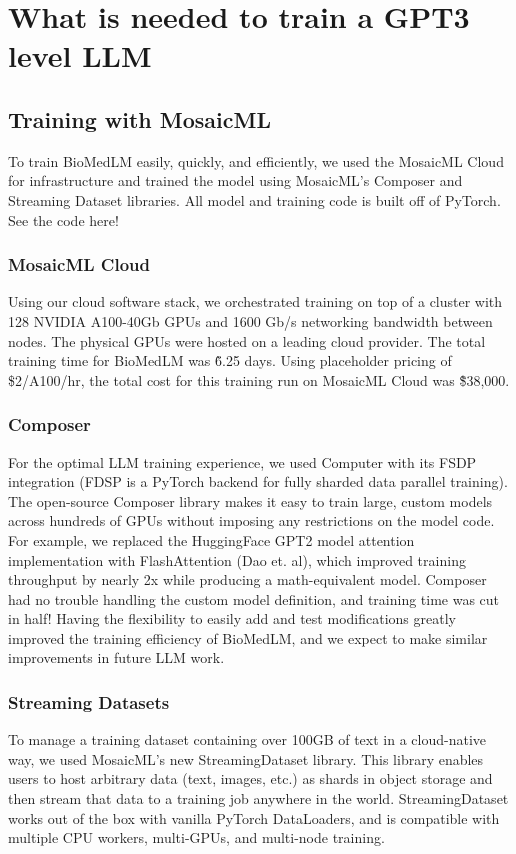 \documentclass[letterpaper]{article}
\begin{document}
\section{What is needed to train a GPT3 level LLM}
\subsection{Training with MosaicML}

To train BioMedLM easily, quickly, and efficiently, we used the MosaicML Cloud for infrastructure and trained the model using MosaicML’s Composer and Streaming Dataset libraries. All model and training code is built off of PyTorch. See the code here!

\subsubsection{MosaicML Cloud}
Using our cloud software stack, we orchestrated training on top of a cluster with 128 NVIDIA A100-40Gb GPUs and 1600 Gb/s networking bandwidth between nodes. 
The physical GPUs were hosted on a leading cloud provider. The total training time for BioMedLM was \~ 6.25 days. 
Using placeholder pricing of \$2/A100/hr, the total cost for this training run on MosaicML Cloud was \~ \$38,000. 

\subsubsection{Composer}
For the optimal LLM training experience, we used Computer with its FSDP integration (FDSP is a PyTorch backend for fully sharded data parallel training). 
The open-source Composer library makes it easy to train large, custom models across hundreds of GPUs without imposing any restrictions on the model code. 
For example, we replaced the HuggingFace GPT2 model attention implementation with FlashAttention (Dao et. al), which improved training throughput by nearly 2x while producing a math-equivalent model. 
Composer had no trouble handling the custom model definition, and training time was cut in half! Having the flexibility to easily add and test modifications greatly improved the training efficiency of BioMedLM, and we expect to make similar improvements in future LLM work.

\subsubsection{Streaming Datasets} 
To manage a training dataset containing over 100GB of text in a cloud-native way, we used MosaicML's new StreamingDataset library.
This library enables users to host arbitrary data (text, images, etc.) as shards in object storage and then stream that data to a training job anywhere in the world. 
StreamingDataset works out of the box with vanilla PyTorch DataLoaders, and is compatible with multiple CPU workers, multi-GPUs, and multi-node training. 
\end{document}
